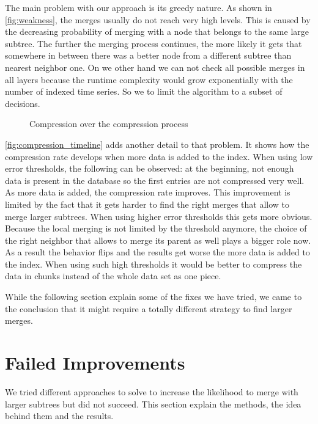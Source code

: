 The main problem with our approach is its greedy nature. As shown in \autoref{fig:weakness}, the merges usually do not reach very high levels. This is caused by the decreasing probability of merging with a node that belongs to the same large subtree. The further the merging process continues, the more likely it gets that somewhere in between there was a better node from a different subtree than nearest neighbor one. On we other hand we can not check all possible merges in all layers because the runtime complexity would grow exponentially with the number of indexed time series. So we to limit the algorithm to a subset of decisions.

\begin{figure}
    \centering
    
    \caption{Compression over the compression process}\label{fig:compression_timeline}
\end{figure}

\autoref{fig:compression_timeline} adds another detail to that problem. It shows how the compression rate develops when more data is added to the index. When using low error thresholds, the following can be observed: at the beginning, not enough data is present in the database so the first entries are not compressed very well. As more data is added, the compression rate improves. This improvement is limited by the fact that it gets harder to find the right merges that allow to merge larger subtrees. When using higher error thresholds this gets more obvious. Because the local merging is not limited by the threshold anymore, the choice of the right neighbor that allows to merge its parent as well plays a bigger role now. As a result the behavior flips and the results get worse the more data is added to the index. When using such high thresholds it would be better to compress the data in chunks instead of the whole data set as one piece.

While the following section explain some of the fixes we have tried, we came to the conclusion that it might require a totally different strategy to find larger merges.



\section{Failed Improvements}
\label{sec:algorithm:fail}

We tried different approaches to solve to increase the likelihood to merge with larger subtrees but did not succeed. This section explain the methods, the idea behind them and the results.



